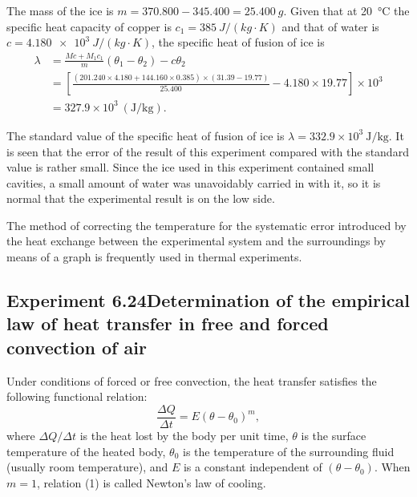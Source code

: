 The mass of the ice is $m=370.800-345.400=\SI{25.400}{g}$. Given that at \SI{20}{\celsius} the specific heat capacity of copper is $c_1=\SI{385}{J/(kg\cdot K)}$ and that of water is $c=\SI{4.180e3}{J/(kg\cdot K)}$, the specific heat of fusion of ice is
\begin{equation*}
\begin{aligned}
\lambda&=\frac{Mc+M_1c_1}{m}(\theta_1-\theta_2)-c\theta_2\\
&=\left[\frac{(201.240\times4.180+144.160\times0.385)\times(31.39-19.77)}{25.400}-4.180\times19.77\right]\times10^{3}\\
&=327.9\times10^{3}\ (\mathrm{J/kg}).
\end{aligned}
\end{equation*}

The standard value of the specific heat of fusion of ice is $\lambda=332.9\times10^{3}\ \mathrm{J/kg}$. It is seen that the error of the result of this experiment compared with the standard value is rather small. Since the ice used in this experiment contained small cavities, a small amount of water was unavoidably carried in with it, so it is normal that the experimental result is on the low side.

\begin{commentary}
The method of correcting the temperature for the systematic error introduced by the heat exchange between the experimental system and the surroundings by means of a graph is frequently used in thermal experiments.
\end{commentary}

\subsection*{Experiment 6.24\quad Determination of the empirical law of heat transfer in free and forced convection of air}

Under conditions of forced or free convection, the heat transfer satisfies the following functional relation:
\begin{equation}\tag{1}
\frac{\Delta Q}{\Delta t}=E(\theta-\theta_0)^{m},
\end{equation}
where $\Delta Q/\Delta t$ is the heat lost by the body per unit time, $\theta$ is the surface temperature of the heated body, $\theta_0$ is the temperature of the surrounding fluid (usually room temperature), and $E$ is a constant independent of $(\theta-\theta_0)$. When $m=1$, relation (1) is called Newton's law of cooling.

